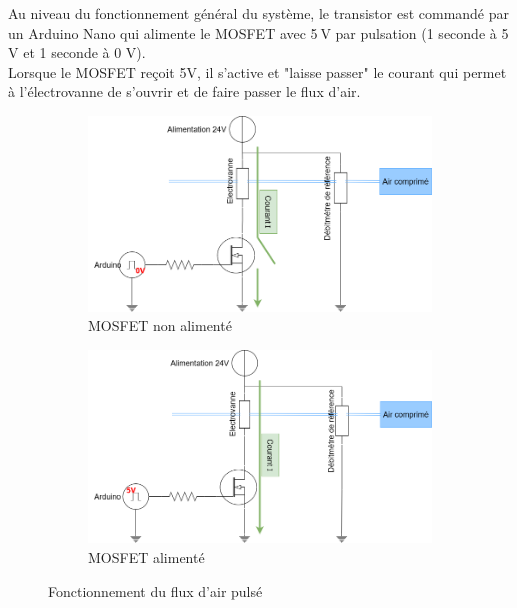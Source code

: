 Au niveau du fonctionnement général du système, le transistor est commandé par un Arduino Nano qui alimente le MOSFET avec 5 V par pulsation (1 seconde à 5 V et 1 seconde à 0 V). \\
Lorsque le MOSFET reçoit 5V, il s'active et "laisse passer" le courant qui permet à l'électrovanne de s'ouvrir et de faire passer le
flux d'air.
\begin{figure}[H]
    \centering
    \begin{subfigure}[b]{0.45\textwidth}
        \hspace{-1.5cm}
        \includegraphics[scale = 0.3]{assets/figures/MOSFET_0V.png}
        \caption{MOSFET non alimenté}
        \label{fig:MOSFET_0V}
    \end{subfigure}
    \begin{subfigure}[b]{0.45\textwidth}
        \centering
        \includegraphics[scale = 0.3]{assets/figures/MOSFET_5V.png}
        \caption{MOSFET alimenté}
        \label{fig:MOSFET_5V}
    \end{subfigure}
    \caption{Fonctionnement du flux d'air pulsé}
    \label{fig:flux_pulse}
\end{figure}

